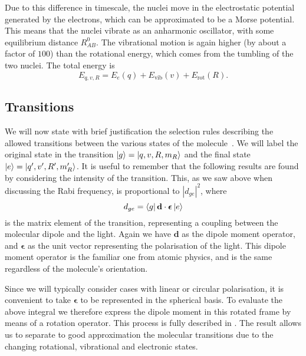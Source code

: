 Due to this difference in timescale, the nuclei move in the electrostatic potential
generated by the electrons, which can be approximated to be a Morse potential. This
means that the nuclei vibrate as an anharmonic oscillator, with some
equilibrium distance $R_{AB}^0$. The vibrational motion is again higher (by
about a factor of $100$) than the rotational energy, which comes from the
tumbling of the two nuclei. The total energy is
%
\begin{equation}
  E_{q,v,R} = E_e(q) + E_\text{vib}(v) + E_\text{rot}(R).
\end{equation}


\subsection{Transitions}
\label{theory:transitions}


We will now state with brief justification the selection rules describing the
allowed transitions between the various states of the
molecule~\cite{brown_carrington_2003}. We will label the original state in the
transition $\ket{g} = \ket{q, v, R, m_R}$ and the final state $\ket{e} =
\ket{q', v', R', m_R'}$.
%
It is useful to remember that the following results are found by considering
the intensity of the transition. This, as we saw above when discussing the Rabi
frequency, is proportional to $|d_{ge}|^2$, where
%
\begin{equation}
  d_{ge} = \bra{g}\mathbf{d}\cdot\bm{\epsilon}\ket{e}
  \label{theory:eqn:dge}
\end{equation}
%
is the matrix element of the transition, representing a coupling between the
molecular dipole and the light. Again we have $\mathbf{d}$ as the dipole moment
operator, and $\bm{\epsilon}$ as the unit vector representing the polarisation
of the light. This dipole moment operator is the familiar one from atomic
physics, and is the same regardless of the molecule's orientation.

Since we will typically consider cases with linear or circular polarisation, it
is convenient to take $\bm{\epsilon}$ to be represented in the spherical basis.
To evaluate the above integral we therefore express the dipole moment in this
rotated frame by means of a rotation operator. This process is fully described
in . The result allows us to separate to good
approximation the molecular transitions due to the changing rotational,
vibrational and electronic states.

